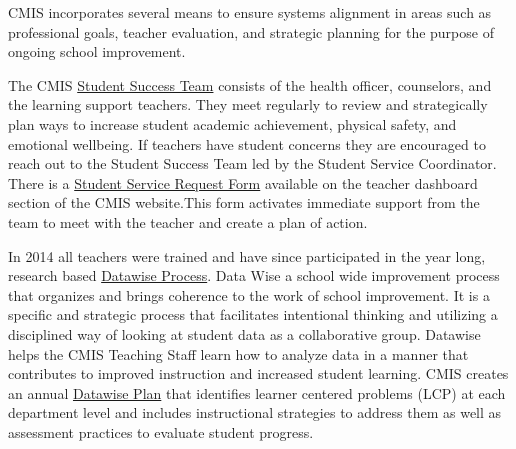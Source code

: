 

\begin{findings}
CMIS incorporates several means to ensure systems alignment in areas such as professional goals, teacher evaluation, and strategic planning for the purpose of ongoing school improvement.

The CMIS \href{https://docs.google.com/a/cmis.ac.th/presentation/d/1sWhr1U3qZIGEu2aQdWOl0OQ5Rkd8iRGWmUlszEJLz2o/edit?usp=sharing}{Student Success Team} consists of the health officer, counselors, and the learning support teachers. They meet regularly to review and strategically plan ways to increase student academic achievement, physical safety, and emotional wellbeing. If teachers have student concerns they are encouraged to reach out to the Student Success Team led by the Student Service Coordinator. There is a \href{https://docs.google.com/a/cmis.ac.th/forms/d/e/1FAIpQLScVtFtaEXarGOjwsiJyGdbLAMbeNzG9m44i1fWXFLbtMKZcUg/viewform}{Student Service Request Form} available on the teacher dashboard section of the CMIS website.This form activates immediate support from the team to meet with the teacher and create a plan of action.

In 2014 all teachers were trained and have since participated in the year long, research based \href{https://drive.google.com/a/cmis.ac.th/file/d/0B71_pYxcTLo-OExlV0Y5UVFBNVU/view?usp=sharing}{Datawise Process}. Data Wise a school wide improvement process that organizes and brings coherence to the work of school improvement.  It is a specific and strategic process that facilitates intentional thinking and utilizing a disciplined way of looking at student data as a collaborative group. Datawise helps the CMIS Teaching Staff learn how to analyze data in a manner that contributes to improved instruction and increased student learning. CMIS creates an annual \href{https://docs.google.com/document/d/1TmnCp5qZiZAUMnUmaU32PBn2UGvCMVtFO8r5OsxwNo4/edit}{Datawise Plan} that identifies learner centered problems (LCP) at each department level and includes instructional strategies to address them as well as assessment practices to evaluate student progress.


\end{findings}
